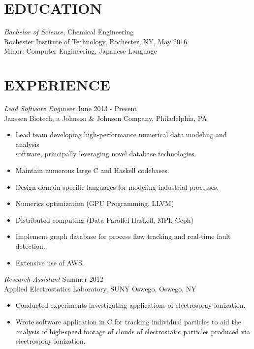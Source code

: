\documentclass[line,margin]{res}
\begin{document}
\address{262 Academy Street, Mexico, NY 13114}
\address{(315) 391-7268 \texttt{|} pi.boy.travis@gmail.com}

\begin{resume}

\section{EDUCATION} {\sl Bachelor of Science,} Chemical Engineering\\
Rochester Institute of Technology, Rochester, NY, May 2016 \\
Minor: Computer Engineering, Japanese Language \\

\section{EXPERIENCE} {\sl Lead Software Engineer} \hfill June 2013 - Present \\
		Janssen Biotech, a Johnson \& Johnson Company,
		Philadelphia, PA
		\begin{itemize}  \itemsep -2pt
		\item   Lead team developing high-performance numerical data modeling and analysis \\ software, principally leveraging novel database technologies.
		\item   Maintain numerous large C and Haskell codebases.
		\item   Design domain-specific languages for modeling industrial processes.
		\item   Numerics optimization (GPU Programming, LLVM)
		\item   Distributed computing (Data Parallel Haskell, MPI, Ceph)
		\item   Implement graph database for process flow tracking and real-time fault detection.
		\item   Extensive use of AWS.
		\end{itemize}

                {\sl Research Assistant} \hfill Summer 2012 \\
                Applied Electrostatics Laboratory,
                SUNY Oswego, Oswego, NY
                 \begin{itemize}  \itemsep -2pt %
                \item   Conducted experiments investigating applications of electrospray ionization.
		\item   Wrote software application in C
			for tracking individual particles
			to aid the analysis of high-speed footage
			of clouds of electrostatic particles
			produced via electrospray ionization.
                \end{itemize}


\end{resume}
\end{document}
